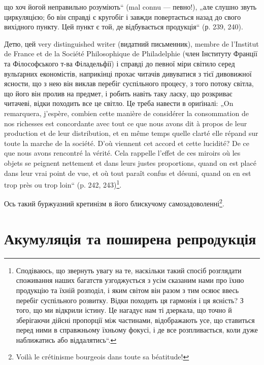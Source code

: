 \parcont{}  %
що хоч йогой неправильно розуміють“ (mal connu — певно!), „але слушно звуть циркуляцією; бо він
справді є кругобіг і завжди повертається назад до свого вихідного пункту. Цей пункт є той, де
відбувається продукція“ (р. 239, 240).

Детю, цей very distinguished writer (видатний письменник), membre de l’Institut de France et de la
Société Philosophique de Philadelphie (член Інституту Франції та Філософського т-ва Філадельфії) і
справді до певної міри світило серед вульґарних економістів, наприкінці прохає читачів дивуватися з
тієї дивовижної ясности, що з нею він виклав перебіг суспільного процесу, з того потоку світла, що
його він пролив на предмет, і робить навіть таку ласку, що розкриває читачеві, відки походить все це
світло. Це треба навести в ориґіналі: „On remarquera, j’espère, combien cette manière de considérer
la consommation de nos richesses est concordante avec tout ce que nous avons dit à propos de leur
production et de leur distribution, et en même temps quelle clarté elle répand sur toute la marche
de la société. D'où viennent cet accord et cette lucidité? De ce que nous avons rencontré la vérité.
Cela rappelle l’effet de ces miroirs où les objets se peignent nettement et dans leurs justes
proportions, quand on est placé dans leur vrai point de vue, et où tout paraît confus et désuni,
quand on en est trop près ou trop loin“ (p. 242, 243)\footnote*{
Сподіваюсь, що звернуть увагу на те, наскільки такий спосіб розглядати споживання наших багатств
узгоджується з усім сказаним нами про їхню продукцію та їхній розподіл, і яким світом він разом з
тим осяює ввесь перебіг суспільного розвитку. Відки походить ця гармонія і ця ясність? З того, що ми
відкрили істину. Це нагадує нам ті дзеркала, що точно й зберігаючи дійсні пропорції між частинами,
відображають усе, що ставиться перед ними в справжньому їхньому фокусі, і де все розпливається, коли
дуже наближатись або віддалятись“.
}.

Ось такий буржуазний кретинізм в його блискучому самозадоволенні\footnote*{
Voilà le crétinisme bourgeois dans toute sa béatitude!
}.
\label{original-380-1}

\section[Акумуляція та поширена репродукція]{Акумуляція та поширена репродукція\footnotemark{}}

